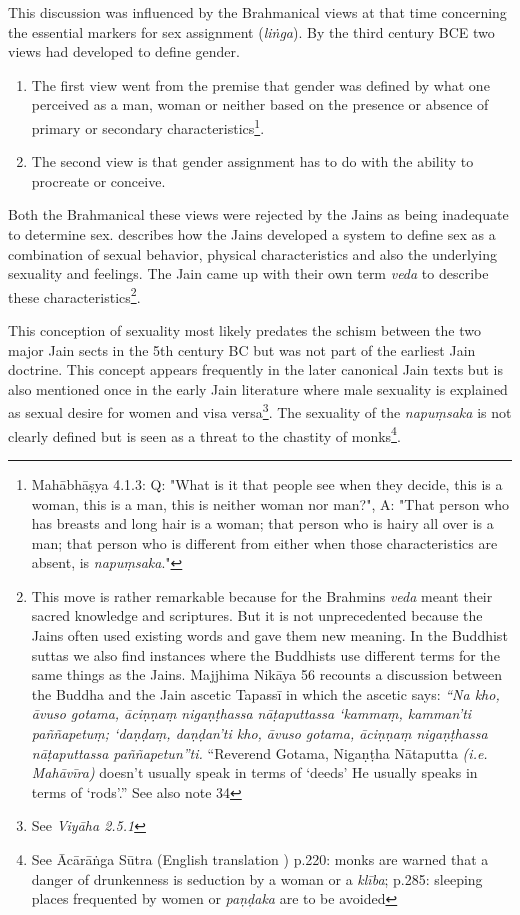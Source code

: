 This discussion was influenced by the Brahmanical views at that time concerning the essential markers for sex assignment ({\em liṅga}). By the third century BCE two views had developed to define gender.
\begin{enumerate}
 \item The first view went from the premise that gender was defined by what one perceived as a man, woman or neither based on the presence or absence of primary or secondary characteristics\footnote{Mahābhāṣya 4.1.3: Q: "What is it that people see when they decide, this is a woman, this is a man, this is neither woman nor man?", A: "That person who has breasts and long hair is a woman; that person who is hairy all over is a man; that person who is different from either when those characteristics are absent, is {\em napuṃsaka}."}.
 \item The second view is that gender assignment has to do with the ability to procreate or conceive. 
\end{enumerate}

Both the Brahmanical these views were rejected by the Jains as being inadequate to determine sex. \cite{dundas} describes how the Jains developed a system to define sex as a combination of sexual behavior, physical characteristics and also the underlying sexuality and feelings. The Jain came up with their own term {\em veda} to describe these characteristics\footnote{This move is rather remarkable because for the Brahmins {\em veda} meant their sacred knowledge and scriptures. But it is not unprecedented because the Jains often used existing words and gave them new meaning. In the Buddhist suttas we also find instances where the Buddhists use different terms for the same things as the Jains. Majjhima Nikāya 56 recounts a discussion between the Buddha and the Jain ascetic Tapassī in which the ascetic says: {\em “Na kho, āvuso gotama, āciṇṇaṃ nigaṇṭhassa nāṭaputtassa ‘kammaṃ, kamman’ti paññapetuṃ; ‘daṇḍaṃ, daṇḍan’ti kho, āvuso gotama, āciṇṇaṃ nigaṇṭhassa nāṭaputtassa paññapetun”ti.} “Reverend Gotama, Nigaṇṭha Nātaputta {\em (i.e. Mahāvīra)} doesn’t usually speak in terms of ‘deeds’ He usually speaks in terms of ‘rods’.” See also \cite{zwilling} note 34}.

This conception of sexuality most likely predates the schism between the two major Jain sects in the 5th century BC but was not part of the earliest Jain doctrine. This concept appears frequently in the later canonical Jain texts but is also mentioned once in the early Jain literature where male sexuality is explained as sexual desire for women and visa versa\footnote{See {\em Viyāha 2.5.1}}. The sexuality of the {\em napuṃsaka} is not clearly defined but is seen as a threat to the chastity of monks\footnote{See Ācārāṅga Sūtra (English translation \cite{jacobi}) p.220: monks are warned that a danger of drunkenness is seduction by a woman or a {\em klība}; p.285: sleeping places frequented by women or {\em paṇḍaka} are to be avoided}.


